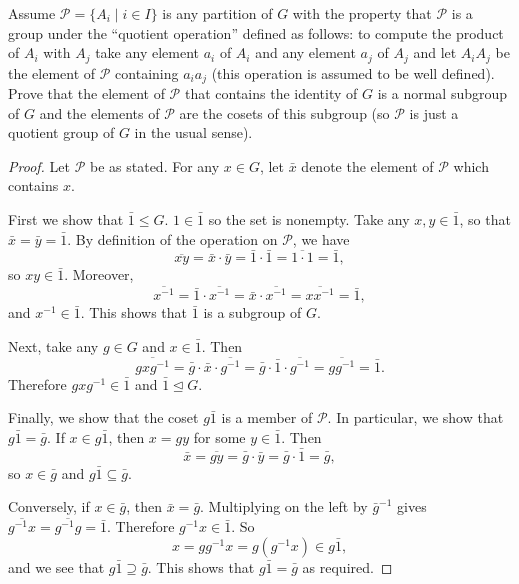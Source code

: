  Assume $\mathcal{P} = \{A_i\mid i\in I\}$ is any
partition of $G$ with the property that $\mathcal{P}$ is a group under
the ``quotient operation'' defined as follows: to compute the product
of $A_i$ with $A_j$ take any element $a_i$ of $A_i$ and any element
$a_j$ of $A_j$ and let $A_iA_j$ be the element of $\mathcal{P}$
containing $a_ia_j$ (this operation is assumed to be well
defined). Prove that the element of $\mathcal{P}$ that contains the
identity of $G$ is a normal subgroup of $G$ and the elements of
$\mathcal{P}$ are the cosets of this subgroup (so $\mathcal{P}$ is
just a quotient group of $G$ in the usual sense).
\begin{proof}
  Let $\mathcal{P}$ be as stated. For any $x\in G$, let $\bar{x}$
  denote the element of $\mathcal{P}$ which contains $x$.

  First we show that $\bar1\leq G$. $1\in\bar1$ so the set is
  nonempty. Take any $x,y\in\bar1$, so that
  $\bar{x} = \bar{y} = \bar1$. By definition of the operation on
  $\mathcal{P}$, we have
  \begin{equation*}
    \overline{xy} = \bar{x}\cdot\bar{y} = \bar1\cdot\bar1
    = \overline{1\cdot1} = \bar1,
  \end{equation*}
  so $xy\in\bar1$. Moreover,
  \begin{equation*}
    \overline{x^{-1}}
    = \bar1\cdot\overline{x^{-1}}
    = \bar{x}\cdot\overline{x^{-1}}
    = \overline{xx^{-1}} = \bar1,
  \end{equation*}
  and $x^{-1}\in\bar1$. This shows that $\bar1$ is a subgroup of $G$.

  Next, take any $g\in G$ and $x\in\bar1$. Then
  \begin{equation*}
    \overline{gxg^{-1}}
    = \bar{g}\cdot\bar{x}\cdot\overline{g^{-1}}
    = \bar{g}\cdot\bar1\cdot\overline{g^{-1}}
    = \overline{gg^{-1}}
    = \bar1.
  \end{equation*}
  Therefore $gxg^{-1}\in\bar1$ and $\bar1\trianglelefteq G$.

  Finally, we show that the coset $g\bar1$ is a member of
  $\mathcal{P}$. In particular, we show that $g\bar1 = \bar{g}$. If
  $x\in g\bar1$, then $x = gy$ for some $y\in\bar1$. Then
  \begin{equation*}
    \bar{x} = \overline{gy} = \bar{g}\cdot\bar{y}
    = \bar{g}\cdot\bar1 = \bar{g},
  \end{equation*}
  so $x\in\bar{g}$ and $g\bar1\subseteq\bar{g}$.

  Conversely, if $x\in\bar{g}$, then $\bar{x} = \bar{g}$. Multiplying
  on the left by $\bar{g}^{-1}$ gives
  $\overline{g^{-1}x} = \overline{g^{-1}g} = \bar1$. Therefore
  $g^{-1}x\in\bar1$. So
  \begin{equation*}
    x = gg^{-1}x = g(g^{-1}x) \in g\bar1,
  \end{equation*}
  and we see that $g\bar1\supseteq\bar{g}$. This shows that
  $g\bar{1} = \bar{g}$ as required.
\end{proof}
